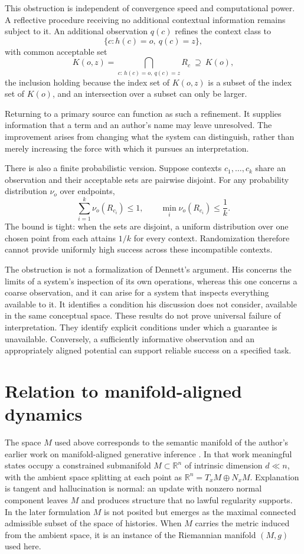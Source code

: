 \documentclass[11pt]{article}
\begin{document}
This obstruction is independent of convergence speed and computational power. A reflective procedure receiving no additional contextual information remains subject to it. An additional observation $q(c)$ refines the context class to
\[
\{c:h(c)=o,\ q(c)=z\},
\]
with common acceptable set
\[
K(o,z)=\bigcap_{c:\,h(c)=o,\ q(c)=z}R_c\ \supseteq\ K(o),
\]
the inclusion holding because the index set of $K(o,z)$ is a subset of the index set of $K(o)$, and an intersection over a subset can only be larger.

Returning to a primary source can function as such a refinement. It supplies information that a term and an author's name may leave unresolved. The improvement arises from changing what the system can distinguish, rather than merely increasing the force with which it pursues an interpretation.

There is also a finite probabilistic version. Suppose contexts $c_1,\ldots,c_k$ share an observation and their acceptable sets are pairwise disjoint. For any probability distribution $\nu_o$ over endpoints,
\[
\sum_{i=1}^k\nu_o(R_{c_i})\leq 1,
\qquad
\min_i\nu_o(R_{c_i})\leq\frac1k.
\]
The bound is tight: when the sets are disjoint, a uniform distribution over one chosen point from each attains $1/k$ for every context. Randomization therefore cannot provide uniformly high success across these incompatible contexts.

The obstruction is not a formalization of Dennett's argument. His concerns the limits of a system's inspection of its own operations, whereas this one concerns a coarse observation, and it can arise for a system that inspects everything available to it. It identifies a condition his discussion does not consider, available in the same conceptual space. These results do not prove universal failure of interpretation. They identify explicit conditions under which a guarantee is unavailable. Conversely, a sufficiently informative observation and an appropriately aligned potential can support reliable success on a specified task.

\section{Relation to manifold-aligned dynamics}
\label{sec:relation}

The space $M$ used above corresponds to the semantic manifold of the author's earlier work on manifold-aligned generative inference \cite{flyxion2025magi,flyxion2026hallucination}. In that work meaningful states occupy a constrained submanifold $M\subset\mathbb{R}^n$ of intrinsic dimension $d\ll n$, with the ambient space splitting at each point as $\mathbb{R}^n = T_xM\oplus N_xM$. Explanation is tangent and hallucination is normal: an update with nonzero normal component leaves $M$ and produces structure that no lawful regularity supports. In the later formulation $M$ is not posited but emerges as the maximal connected admissible subset of the space of histories. When $M$ carries the metric induced from the ambient space, it is an instance of the Riemannian manifold $(M,g)$ used here.
\end{document}
